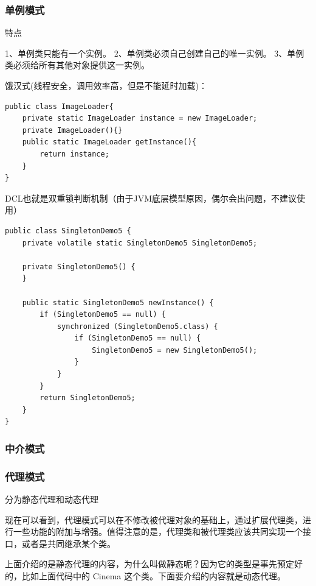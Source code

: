 \documentclass[UTF8]{ctexart}
\begin{document}
\subsubsection{单例模式}
特点

1、单例类只能有一个实例。
2、单例类必须自己创建自己的唯一实例。
3、单例类必须给所有其他对象提供这一实例。

饿汉式(线程安全，调用效率高，但是不能延时加载)：
\begin{lstlisting}
public class ImageLoader{ 
	private static ImageLoader instance = new ImageLoader; 
	private ImageLoader(){} 
	public static ImageLoader getInstance(){  
		return instance;  
	} 
}
\end{lstlisting}

DCL也就是双重锁判断机制（由于JVM底层模型原因，偶尔会出问题，不建议使用）
\begin{lstlisting}
public class SingletonDemo5 {
	private volatile static SingletonDemo5 SingletonDemo5;
	
	private SingletonDemo5() {
	}
	
	public static SingletonDemo5 newInstance() {
		if (SingletonDemo5 == null) {
			synchronized (SingletonDemo5.class) {
				if (SingletonDemo5 == null) {
					SingletonDemo5 = new SingletonDemo5();
				}
			}
		}
		return SingletonDemo5;
	}
}
\end{lstlisting}


\subsubsection{中介模式}



\subsubsection{代理模式}

分为静态代理和动态代理

现在可以看到，代理模式可以在不修改被代理对象的基础上，通过扩展代理类，进行一些功能的附加与增强。值得注意的是，代理类和被代理类应该共同实现一个接口，或者是共同继承某个类。

上面介绍的是静态代理的内容，为什么叫做静态呢？因为它的类型是事先预定好的，比如上面代码中的 Cinema 这个类。下面要介绍的内容就是动态代理。
\end{document}
